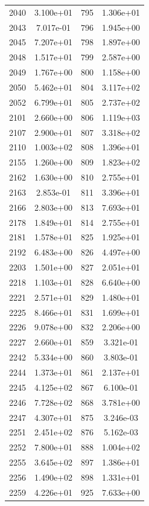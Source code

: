 \documentclass[12pt]{article}
\begin{document}
\begin{longtable}{@{}cccc@{}}
2040 & 3.100e+01 & 795 & 1.306e+01 \\
2043 & 7.017e-01 & 796 & 1.945e+00 \\
2045 & 7.207e+01 & 798 & 1.897e+00 \\
2048 & 1.517e+01 & 799 & 2.587e+00 \\
2049 & 1.767e+00 & 800 & 1.158e+00 \\
2050 & 5.462e+01 & 804 & 3.117e+02 \\
2052 & 6.799e+01 & 805 & 2.737e+02 \\
2101 & 2.660e+00 & 806 & 1.119e+03 \\
2107 & 2.900e+01 & 807 & 3.318e+02 \\
2110 & 1.003e+02 & 808 & 1.396e+01 \\
2155 & 1.260e+00 & 809 & 1.823e+02 \\
2162 & 1.630e+00 & 810 & 2.755e+01 \\
2163 & 2.853e-01 & 811 & 3.396e+01 \\
2166 & 2.803e+00 & 813 & 7.693e+01 \\
2178 & 1.849e+01 & 814 & 2.755e+01 \\
2181 & 1.578e+01 & 825 & 1.925e+01 \\
2192 & 6.483e+00 & 826 & 4.497e+00 \\
2203 & 1.501e+00 & 827 & 2.051e+01 \\
2218 & 1.103e+01 & 828 & 6.640e+00 \\
2221 & 2.571e+01 & 829 & 1.480e+01 \\
2225 & 8.466e+01 & 831 & 1.699e+01 \\
2226 & 9.078e+00 & 832 & 2.206e+00 \\
2227 & 2.660e+01 & 859 & 3.321e-01 \\
2242 & 5.334e+00 & 860 & 3.803e-01 \\
2244 & 1.373e+01 & 861 & 2.137e+01 \\
2245 & 4.125e+02 & 867 & 6.100e-01 \\
2246 & 7.728e+02 & 868 & 3.781e+00 \\
2247 & 4.307e+01 & 875 & 3.246e-03 \\
2251 & 2.451e+02 & 876 & 5.162e-03 \\
2252 & 7.800e+01 & 888 & 1.004e+02 \\
2255 & 3.645e+02 & 897 & 1.386e+01 \\
2256 & 1.490e+02 & 898 & 1.331e+01 \\
2259 & 4.226e+01 & 925 & 7.633e+00 \\

\bottomrule
\end{longtable}
\end{document}
